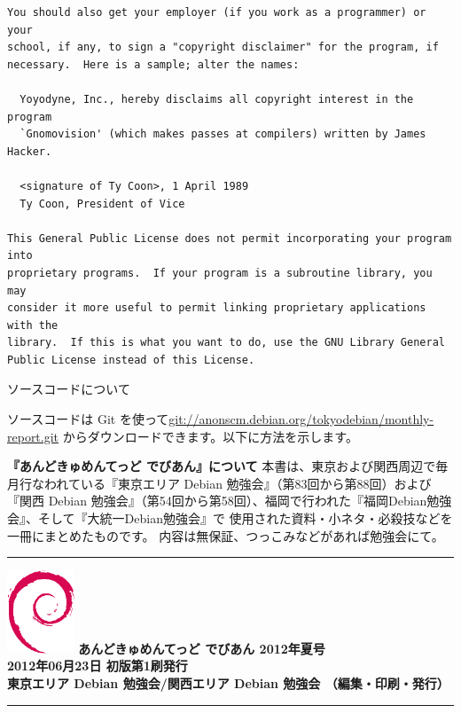 \documentclass[mingoth,a4paper]{jsarticle}
\begin{document}
\begin{multicols}{2}
\begin{fontsize}{6}{6}
\begin{verbatim}
You should also get your employer (if you work as a programmer) or your
school, if any, to sign a "copyright disclaimer" for the program, if
necessary.  Here is a sample; alter the names:

  Yoyodyne, Inc., hereby disclaims all copyright interest in the program
  `Gnomovision' (which makes passes at compilers) written by James Hacker.

  <signature of Ty Coon>, 1 April 1989
  Ty Coon, President of Vice

This General Public License does not permit incorporating your program into
proprietary programs.  If your program is a subroutine library, you may
consider it more useful to permit linking proprietary applications with the
library.  If this is what you want to do, use the GNU Library General
Public License instead of this License.
 \end{verbatim}
 \end{fontsize}
\end{multicols}

\begin{center}
ソースコードについて
\end{center}

ソースコードは Git を使って\url{git://anonscm.debian.org/tokyodebian/monthly-report.git}
からダウンロードできます。以下に方法を示します。


\cleartoevenpage

\thispagestyle{empty}
{
\large
\begin{itembox}{\bf 『あんどきゅめんてっど でびあん』について}
本書は、東京および関西周辺で毎月行なわれている『東京エリア Debian 勉強会』（第83回から第88回）および
『関西 Debian 勉強会』（第54回から第58回）、福岡で行われた『福岡Debian勉強会』、そして『大統一Debian勉強会』で
使用された資料・小ネタ・必殺技などを一冊にまとめたものです。
内容は無保証、つっこみなどがあれば勉強会にて。
\end{itembox}
}

\vspace*{15cm}
{\color{dancerlightblue}\rule{\hsize}{1mm}}
\vspace{2mm}
\includegraphics[width=2cm]{image200502/openlogo-nd.eps}
\noindent \Large \bf あんどきゅめんてっど でびあん 2012年夏号\\
\noindent \normalfont 2012年06月23日 \hspace{5mm}  初版第1刷発行\\
\noindent \normalfont 東京エリア Debian 勉強会/関西エリア Debian 勉強会 （編集・印刷・発行）\\
{\color{dancerdarkblue}\rule{\hsize}{1mm}}
\end{document}
